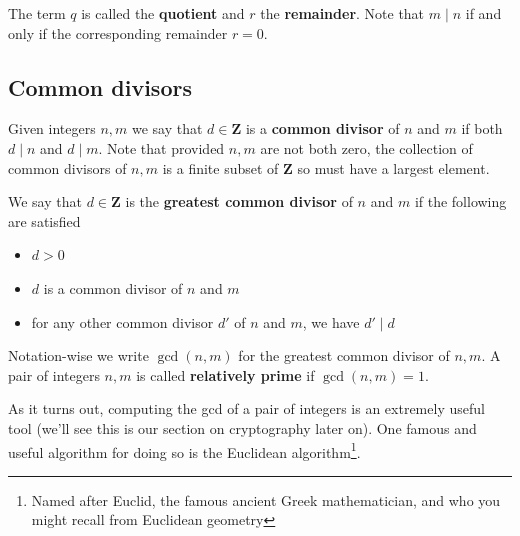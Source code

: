 \documentclass[12pt]{article}
\numberwithin{equation}{subsection}
\theoremstyle{note}
\begin{document}
The term $q$ is called the \textbf{quotient} and $r$ the \textbf{remainder}. Note that $m \mid n$ if and only if the corresponding remainder $r=0$. 

\subsection{Common divisors}
Given integers $n,m$ we say that $d\in \mathbf{Z}$ is a \textbf{common divisor} of $n$ and $m$ if both $d\mid n$ and $d\mid m$. Note that provided $n,m$ are not both zero, the collection of common divisors of $n,m$ is a finite subset of $\mathbf{Z}$ so must have a largest element. 

We say that $d\in \mathbf{Z}$ is the \textbf{greatest common divisor} of $n$ and $m$ if the following are satisfied
\begin{itemize}
	\item $d>0$ 
	\item $d$ is a common divisor of $n$ and $m$ 
	\item for any other common divisor $d'$ of $n$ and $m$, we have $d'\mid d$
\end{itemize}
Notation-wise we write $\gcd(n,m)$ for the greatest common divisor of $n,m$. A pair of integers $n,m$ is called \textbf{relatively prime} if $\gcd(n,m)=1$. 




As it turns out, computing the gcd of a pair of integers is an extremely useful tool (we'll see this is our section on cryptography later on). One famous and useful algorithm for doing so is the Euclidean algorithm\footnote{Named after Euclid, the famous ancient Greek mathematician, and who you might recall from Euclidean geometry}.
\end{document}
